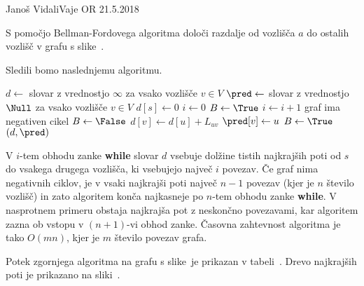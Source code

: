 \begin{naloga}{Janoš Vidali}{Vaje OR 21.5.2018}
\begin{vprasanje}
S pomočjo Bellman-Fordovega algoritma
določi razdalje od vozlišča $a$ do ostalih vozlišč
v grafu s slike~\fig.

\begin{slika}
\pgfslika
{}
\end{slika}
\end{vprasanje}

\begin{odgovor}
Sledili bomo naslednjemu algoritmu.
\begin{small}
\begin{algorithmic}
    \State $d \gets$ slovar z vrednostjo $\infty$ za vsako vozlišče $v \in V$
    \State $\pred \gets$ slovar z vrednostjo $\Null$
        za vsako vozlišče $v \in V$
    \State $d[s] \gets 0$
    \State $i \gets 0$
    \State $B \gets \True$
        \State $i \gets i+1$
            \State \Return graf ima negativen cikel
        \EndIf
        \State $B \gets \False$
                \State $d[v] \gets d[u] + L_{uv}$
                \State $\pred[v] \gets u$
                \State $B \gets \True$
            \EndIf
        \EndFor
    \EndWhile
    \State \Return $(d, \pred)$
\EndFunction
\end{algorithmic}
\end{small}
V $i$-tem obhodu zanke {\bf while}
slovar $d$ vsebuje dolžine tistih najkrajših poti
od $s$ do vsakega drugega vozlišča,
ki vsebujejo največ $i$ povezav.
Če graf nima negativnih ciklov,
je v vsaki najkrajši poti največ $n-1$ povezav
(kjer je $n$ število vozlišč)
in zato algoritem konča najkasneje po $n$-tem obhodu zanke {\bf while}.
V nasprotnem primeru obstaja najkrajša pot z neskončno povezavami,
kar algoritem zazna ob vstopu v $(n+1)$-vi obhod zanke.
Časovna zahtevnost algoritma je tako $O(mn)$,
kjer je $m$ število povezav grafa.

Potek zgornjega algoritma na grafu s slike~\fig je prikazan v tabeli~\tab.
Drevo najkrajših poti je prikazano na sliki~\fig[bf-resitev].


\end{odgovor}
\end{naloga}
